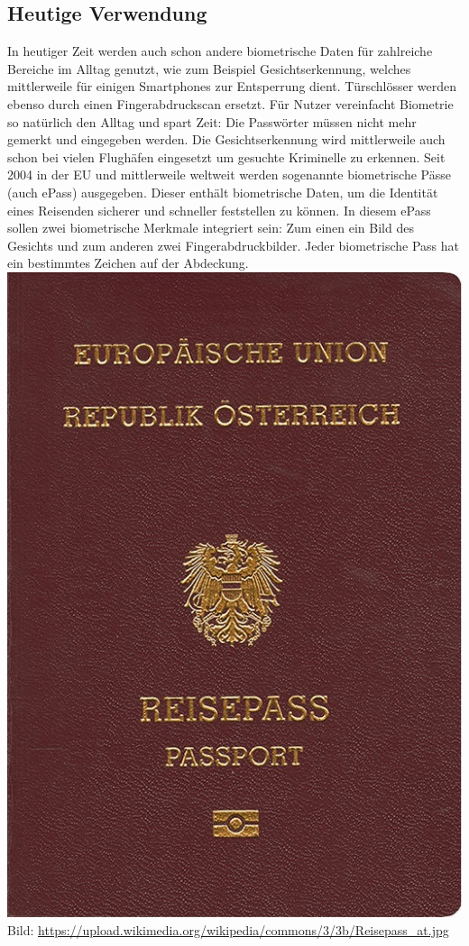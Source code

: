 \documentclass[12pt,a4paper]{article}
\begin{document}
\subsection{Heutige Verwendung}
In heutiger Zeit werden auch schon andere biometrische Daten für zahlreiche Bereiche im Alltag genutzt, wie zum Beispiel Gesichtserkennung, welches mittlerweile für einigen Smartphones zur Entsperrung dient. Türschlösser werden ebenso durch einen Fingerabdruckscan ersetzt. Für Nutzer vereinfacht Biometrie so natürlich den Alltag und spart Zeit: Die Passwörter müssen nicht mehr gemerkt und eingegeben werden. 
Die Gesichtserkennung wird mittlerweile auch schon bei vielen Flughäfen eingesetzt um gesuchte Kriminelle zu erkennen. \newline
Seit 2004 in der EU und mittlerweile weltweit werden sogenannte biometrische Pässe (auch ePass) ausgegeben. Dieser enthält biometrische Daten, um die Identität eines Reisenden sicherer und schneller feststellen zu können. In diesem ePass sollen zwei biometrische Merkmale integriert sein: Zum einen ein Bild des Gesichts und zum anderen zwei Fingerabdruckbilder. Jeder biometrische Pass hat ein bestimmtes Zeichen auf der Abdeckung.
\cite{reisepass} \newline
\includegraphics[scale=0.25]{Reisepass_at.jpg}
\newline
Bild: \url{https://upload.wikimedia.org/wikipedia/commons/3/3b/Reisepass_at.jpg}
\end{document}
